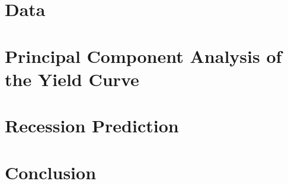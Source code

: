 \documentclass[12pt]{article}
\begin{document}
\section{Data}
\label{sec:data}


\section{Principal Component Analysis of the Yield Curve}
\label{sec:pca}


\section{Recession Prediction}
\label{sec:scenario}


%

\section{Conclusion}
\label{sec:conclusion}

\newpage
    

\setcounter{page}{30} %

\appendix

\setcounter{equation}{0}




\RaggedRight


\end{document}
